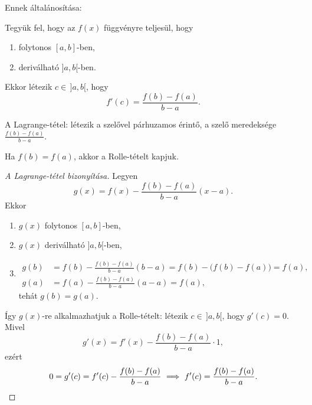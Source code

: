 \documentclass[11pt]{article}
\begin{document}
\noindent Ennek általánosítása:

\begin{thmbox}
\begin{theorem}
Tegyük fel, hogy az $f(x)$ függvényre teljesül, hogy
\begin{enumerate}[label=\alph*)]
\item folytonos $[a, b]$-ben,
\item deriválható $]a, b[$-ben.
\end{enumerate}
Ekkor létezik $c\in\,]a, b[$, hogy
\begin{equation}\label{eq:lagrange}
f'(c)=\frac{f(b)-f(a)}{b-a}.
\end{equation}
\end{theorem}
\end{thmbox}

\begin{notefig}{A Lagrange-tétel: létezik a szelővel párhuzamos érintő, a szelő meredeksége $\frac{f(b)-f(a)}{b-a}$.}
\end{notefig}

\begin{remark}
Ha $f(b)=f(a)$, akkor a Rolle-tételt kapjuk.
\end{remark}

\begin{proof}[A Lagrange-tétel bizonyítása]
Legyen
\[
g(x)=f(x)-\frac{f(b)-f(a)}{b-a}(x-a).
\]
Ekkor
\begin{enumerate}[label=\arabic*.]
\item $g(x)$ folytonos $[a, b]$-ben,
\item $g(x)$ deriválható $]a, b[$-ben,
\item \leavevmode\vspace{-\baselineskip}
\begin{align*}
g(b)&=f(b)-\frac{f(b)-f(a)}{b-a}(b-a)=f(b)-\bigl(f(b)-f(a)\bigr)=f(a),\\
g(a)&=f(a)-\frac{f(b)-f(a)}{b-a}(a-a)=f(a),
\end{align*}
tehát $g(b)=g(a)$.
\end{enumerate}
Így $g(x)$-re alkalmazhatjuk a Rolle-tételt: létezik $c\in\,]a, b[$, hogy $g'(c)=0$. Mivel
\[
g'(x)=f'(x)-\frac{f(b)-f(a)}{b-a}\cdot 1,
\]
ezért
\[
0=g'(c)=f'(c)-\frac{f(b)-f(a)}{b-a}\ \Longrightarrow\ f'(c)=\frac{f(b)-f(a)}{b-a}. \qedhere
\]
\end{proof}
\end{document}
